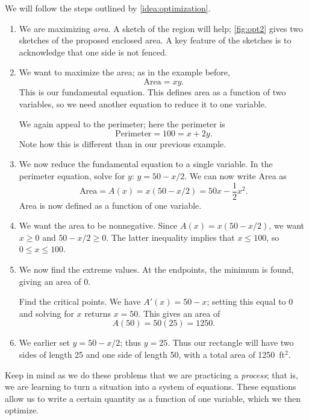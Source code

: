{We will follow the steps outlined by \autoref{idea:optimization}. 
\begin{enumerate}
	\item		We are maximizing \textit{area}. A sketch of the region will help; \autoref{fig:opt2} gives two sketches of the proposed enclosed area. A key feature of the sketches is to acknowledge that one side is not fenced. 
	
	\item		We want to maximize the area; as in the example before, $$\text{Area} = xy.$$ This is our fundamental equation. This defines area as a function of two variables, so we need another equation to  reduce it to one variable. 
	
	We again appeal to the perimeter; here the perimeter is $$\text{Perimeter} = 100 = x+2y.$$ Note how this is different than in our previous example.
	\item		We now reduce the fundamental equation to a single variable. In the perimeter equation, solve for $y$: $y = 50 - x/2$. We can now write Area as $$\text{Area} = A(x) = x(50-x/2) = 50x - \frac12x^2.$$ Area is now defined as a function of one variable.
	\item		We want the area to be nonnegative. Since $A(x) = x(50-x/2)$, we want $x\geq 0$ and $50-x/2\geq 0$. The latter inequality implies that $x\leq100$, so $0\leq x\leq 100$. 
	\item		We now find the extreme values. At the endpoints, the minimum is found, giving an area of 0. 
	
	Find the critical points. We have $A'(x) = 50-x$; setting this equal to 0 and solving for $x$ returns $x=50$. This gives an area of $$A(50) = 50(25) = 1250.$$
	\item		We earlier set $y = 50-x/2$; thus $y = 25$. Thus our rectangle will have two sides of length 25 and one side of length 50, with a total area of 1250~ft$^2$.\eoehere
\end{enumerate}}

Keep in mind as we do these problems that we are practicing a \textit{process}; that is, we are learning to turn a situation into a system of equations. These equations allow us to write a certain quantity as a function of one variable, which we then optimize.

